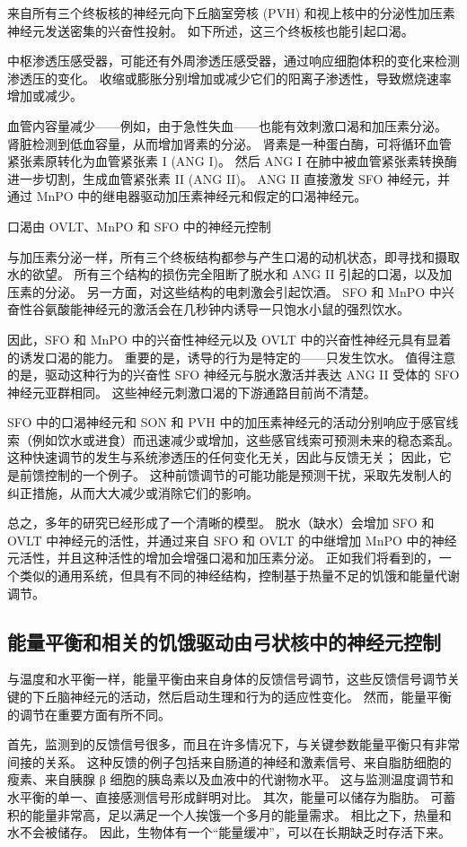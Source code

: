 来自所有三个终板核的神经元向下丘脑室旁核 (PVH) 和视上核中的分泌性加压素神经元发送密集的兴奋性投射。 如下所述，这三个终板核也能引起口渴。

中枢渗透压感受器，可能还有外周渗透压感受器，通过响应细胞体积的变化来检测渗透压的变化。 收缩或膨胀分别增加或减少它们的阳离子渗透性，导致燃烧速率增加或减少。

血管内容量减少——例如，由于急性失血——也能有效刺激口渴和加压素分泌。 肾脏检测到低血容量，从而增加肾素的分泌。 肾素是一种蛋白酶，可将循环血管紧张素原转化为血管紧张素 I (ANG I)。 然后 ANG I 在肺中被血管紧张素转换酶进一步切割，生成血管紧张素 II (ANG II)。 ANG II 直接激发 SFO 神经元，并通过 MnPO 中的继电器驱动加压素神经元和假定的口渴神经元。

口渴由 OVLT、MnPO 和 SFO 中的神经元控制

与加压素分泌一样，所有三个终板结构都参与产生口渴的动机状态，即寻找和摄取水的欲望。 所有三个结构的损伤完全阻断了脱水和 ANG II 引起的口渴，以及加压素的分泌。 另一方面，对这些结构的电刺激会引起饮酒。 SFO 和 MnPO 中兴奋性谷氨酸能神经元的激活会在几秒钟内诱导一只饱水小鼠的强烈饮水。

因此，SFO 和 MnPO 中的兴奋性神经元以及 OVLT 中的兴奋性神经元具有显着的诱发口渴的能力。 重要的是，诱导的行为是特定的——只发生饮水。 值得注意的是，驱动这种行为的兴奋性 SFO 神经元与脱水激活并表达 ANG II 受体的 SFO 神经元亚群相同。 这些神经元刺激口渴的下游通路目前尚不清楚。

SFO 中的口渴神经元和 SON 和 PVH 中的加压素神经元的活动分别响应于感官线索（例如饮水或进食）而迅速减少或增加，这些感官线索可预测未来的稳态紊乱。 这种快速调节的发生与系统渗透压的任何变化无关，因此与反馈无关； 因此，它是前馈控制的一个例子。 这种前馈调节的可能功能是预测干扰，采取先发制人的纠正措施，从而大大减少或消除它们的影响。

总之，多年的研究已经形成了一个清晰的模型。 脱水（缺水）会增加 SFO 和 OVLT 中神经元的活性，并通过来自 SFO 和 OVLT 的中继增加 MnPO 中的神经元活性，并且这种活性的增加会增强口渴和加压素分泌。 正如我们将看到的，一个类似的通用系统，但具有不同的神经结构，控制基于热量不足的饥饿和能量代谢调节。

\subsection{能量平衡和相关的饥饿驱动由弓状核中的神经元控制}
与温度和水平衡一样，能量平衡由来自身体的反馈信号调节，这些反馈信号调节关键的下丘脑神经元的活动，然后启动生理和行为的适应性变化。 然而，能量平衡的调节在重要方面有所不同。

首先，监测到的反馈信号很多，而且在许多情况下，与关键参数能量平衡只有非常间接的关系。 这种反馈的例子包括来自肠道的神经和激素信号、来自脂肪细胞的瘦素、来自胰腺 β 细胞的胰岛素以及血液中的代谢物水平。 这与监测温度调节和水平衡的单一、直接感测信号形成鲜明对比。 其次，能量可以储存为脂肪。 可蓄积的能量非常高，足以满足一个人挨饿一个多月的能量需求。 相比之下，热量和水不会被储存。 因此，生物体有一个“能量缓冲”，可以在长期缺乏时存活下来。

